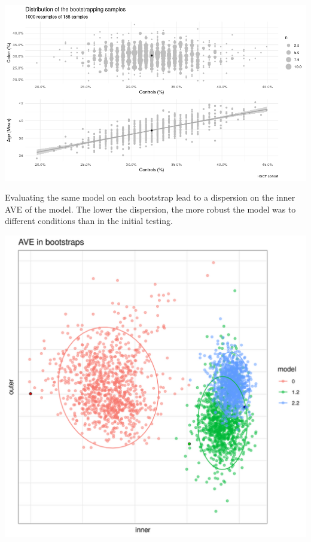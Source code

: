 \documentclass[
  12pt,
  a4paper,
  twoside,
  openright]{book}
\let\origfigure\figure
\let\endorigfigure\endfigure
\renewenvironment{figure}[1][2] {
    \expandafter\origfigure\expandafter[!htp]
} {
    \endorigfigure
}
\begin{document}
\begin{figure}
\includegraphics[width=1\linewidth]{images/hsct-bootstrap-characteristics} \caption[Characteristics of the samples of the HSCT bootstraped samples.]{Dispersion of the bootstraped samples on age and percentage of colon and controls samples.}\label{fig:hsct-bootstrap-quality}
\end{figure}

Evaluating the same model on each bootstrap lead to a dispersion on the inner AVE of the model.
The lower the dispersion, the more robust the model was to different conditions than in the initial testing.

\begin{figure}
\includegraphics[width=1\linewidth]{images/hsct-bootstrap} \caption[Bootstrap results on HSCT dataset.]{Bootstrap of the models 0, 1.2 and 2.2. The point with the black circle is the AVE of the original data. The dispersion is shown by the ellipses. Model 0 and 1.2 have lower inner and outer AVE score, model 2.2 has lower outer score but higher inner value than the bootstrapped.}\label{fig:hsct-bootstrap}
\end{figure}
\end{document}
